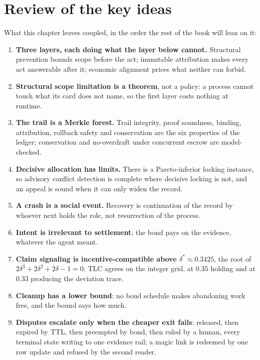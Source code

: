 \documentclass[11pt,a4paper]{article}
\theoremstyle{definition}
\theoremstyle{remark}
\begin{document}
\section*{Review of the key ideas}

What this chapter leaves coupled, in the order the rest of the book will lean on it:

\begin{enumerate}[leftmargin=1.6em,itemsep=2pt]
\item \textbf{Three layers, each doing what the layer below cannot.} Structural prevention bounds scope before the act; immutable attribution makes every act answerable after it; economic alignment prices what neither can forbid.
\item \textbf{Structural scope limitation is a theorem}, not a policy: a process cannot touch what its card does not name, so the first layer costs nothing at runtime.
\item \textbf{The trail is a Merkle forest.} Trail integrity, proof soundness, binding, attribution, rollback safety and conservation are the six properties of the ledger; conservation and no-overdraft under concurrent escrow are model-checked.
\item \textbf{Decisive allocation has limits.} There is a Pareto-inferior locking instance, so advisory conflict detection is complete where decisive locking is not, and an appeal is sound when it can only widen the record.
\item \textbf{A crash is a social event.} Recovery is continuation of the record by whoever next holds the role, not resurrection of the process.
\item \textbf{Intent is irrelevant to settlement}; the bond pays on the evidence, whatever the agent meant.
\item \textbf{Claim signaling is incentive-compatible above $\delta^{\ast}\approx0.3425$}, the root of $2\delta^{3}+2\delta^{2}+2\delta-1=0$; TLC agrees on the integer grid, at $0.35$ holding and at $0.33$ producing the deviation trace.
\item \textbf{Cleanup has a lower bound}: no bond schedule makes abandoning work free, and the bound says how much.
\item \textbf{Disputes escalate only when the cheaper exit fails}: released, then expired by TTL, then preempted by bond, then ruled by a human, every terminal state writing to one evidence rail; a magic link is redeemed by one row update and refused by the second reader.
\end{enumerate}
\end{document}
